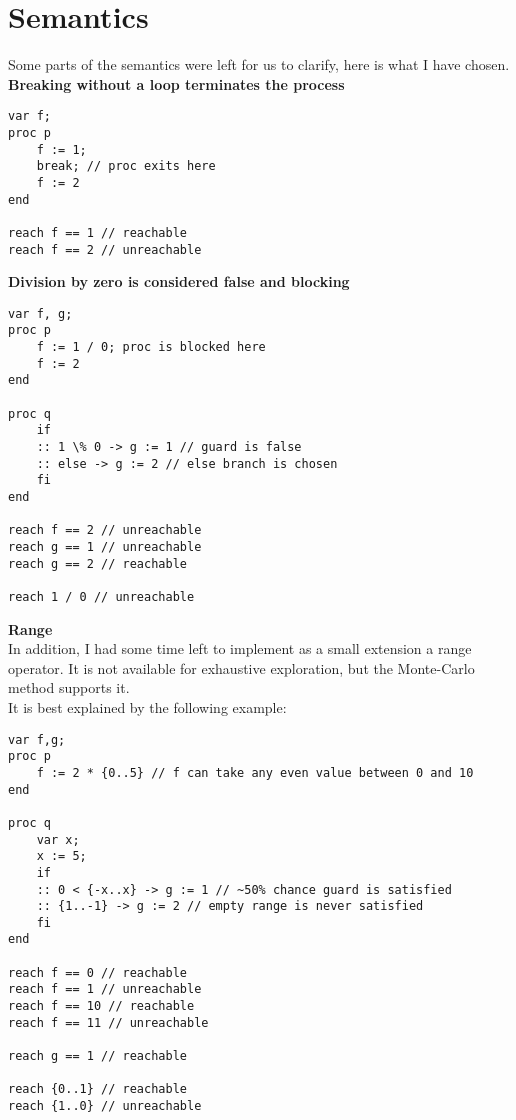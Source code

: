 \section{Semantics}

Some parts of the semantics were left for us to clarify, here is what I have chosen.\\

\textbf{Breaking without a loop terminates the process}
\begin{lstlisting}
var f;
proc p
    f := 1;
    break; // proc exits here
    f := 2
end

reach f == 1 // reachable
reach f == 2 // unreachable
\end{lstlisting}


\textbf{Division by zero is considered false and blocking}
\begin{lstlisting}
var f, g;
proc p
    f := 1 / 0; proc is blocked here
    f := 2
end

proc q
    if
    :: 1 \% 0 -> g := 1 // guard is false
    :: else -> g := 2 // else branch is chosen
    fi
end

reach f == 2 // unreachable
reach g == 1 // unreachable
reach g == 2 // reachable

reach 1 / 0 // unreachable
\end{lstlisting}

\textbf{Range}\\
In addition, I had some time left to implement as a small extension
a range operator. It is not available for exhaustive exploration,
but the Monte-Carlo method supports it.\\
It is best explained by the following example:
\begin{lstlisting}
var f,g;
proc p
    f := 2 * {0..5} // f can take any even value between 0 and 10
end

proc q
    var x;
    x := 5;
    if
    :: 0 < {-x..x} -> g := 1 // ~50% chance guard is satisfied
    :: {1..-1} -> g := 2 // empty range is never satisfied
    fi
end

reach f == 0 // reachable
reach f == 1 // unreachable
reach f == 10 // reachable
reach f == 11 // unreachable

reach g == 1 // reachable

reach {0..1} // reachable
reach {1..0} // unreachable
\end{lstlisting}

